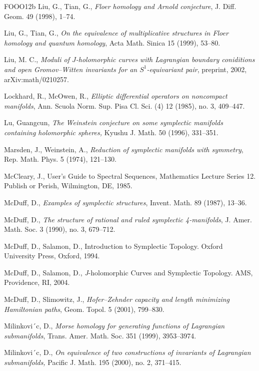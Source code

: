 \begin{thebibliography}{FOOO12b}
 Liu, G., Tian, G., \emph{Floer homology and Arnold conjecture}, J. Diﬀ. Geom. 49
  (1998), 1–74.

 Liu, G., Tian, G., \emph{On the equivalence of multiplicative structures in Floer
  homology and quantum homology}, Acta Math. Sinica 15 (1999), 53–80.

 Liu, M. C., \emph{Moduli of $J$-holomorphic curves with Lagrangian boundary
  coniditions and open Gromov–Witten invariants for an $S^1$-equivariant pair}, preprint, 2002,
  arXiv:math/0210257.

 Lockhard, R., McOwen, R., \emph{Elliptic diﬀerential operators on noncom\-pact
  manifolds}, Ann. Scuola Norm. Sup. Pisa Cl. Sci. (4) 12 (1985), no. 3, 409–447.

 Lu, Guangcun, \emph{The Weinstein conjecture on some symplectic manifolds
  containing holomorphic spheres,} Kyushu J. Math. 50 (1996), 331–351.

 Marsden, J., Weinstein, A., \emph{Reduction of symplectic manifolds with symmetry},
  Rep. Math. Phys. 5 (1974), 121–130.

 McCleary, J., User’s Guide to Spectral Sequences, Mathematics Lecture Series 12.
  Publish or Perish, Wilmington, DE, 1985.

 McDuﬀ, D., \emph{Examples of symplectic structures}, Invent. Math. 89 (1987), 13–36.

 McDuﬀ, D., \emph{The structure of rational and ruled symplectic 4-manifolds}, J.
  Amer. Math. Soc. 3 (1990), no. 3, 679–712.

 McDuﬀ, D., Salamon, D., Introduction to Symplectic Topology. Oxford University
  Press, Oxford, 1994.

 McDuﬀ, D., Salamon, D., \emph{J}-holomorphic Curves and Symplectic Topol\-ogy.
  AMS, Providence, RI, 2004.

 McDuﬀ, D., Slimowitz, J., \emph{Hofer–Zehnder capacity and length minimiz\-ing
  Hamiltonian paths}, Geom. Topol. 5 (2001), 799–830.

 Milinkovi´c, D., \emph{Morse homology for generating functions of Lagrangian
  submanifolds}, Trans. Amer. Math. Soc. 351 (1999), 3953–3974.

 Milinkovi´c, D., \emph{On equivalence of two constructions of invariants of
  Lagrangian submanifolds,} Pacific J. Math. 195 (2000), no. 2, 371–415.


\end{thebibliography}
